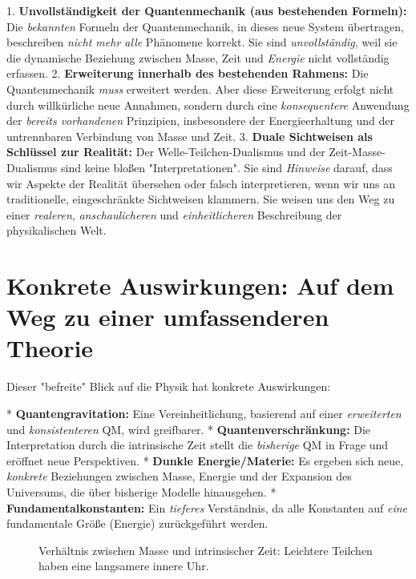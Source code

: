\documentclass[a4paper,12pt]{article}
\begin{document}
	1.  \textbf{Unvollständigkeit der Quantenmechanik (aus bestehenden Formeln):} Die \emph{bekannten} Formeln der Quantenmechanik, in dieses neue System übertragen, beschreiben \emph{nicht mehr alle} Phänomene korrekt. Sie sind \emph{unvollständig}, weil sie die dynamische Beziehung zwischen Masse, Zeit und \emph{Energie} nicht vollständig erfassen.
	2.  \textbf{Erweiterung innerhalb des bestehenden Rahmens:} Die Quantenmechanik \emph{muss} erweitert werden. Aber diese Erweiterung erfolgt nicht durch willkürliche neue Annahmen, sondern durch eine \emph{konsequentere} Anwendung der \emph{bereits vorhandenen} Prinzipien, insbesondere der Energieerhaltung und der untrennbaren Verbindung von Masse und Zeit.
	3.  \textbf{Duale Sichtweisen als Schlüssel zur Realität:} Der Welle-Teilchen-Dualismus und der Zeit-Masse-Dualismus sind keine bloßen "Interpretationen". Sie sind \emph{Hinweise} darauf, dass wir Aspekte der Realität übersehen oder falsch interpretieren, wenn wir uns an traditionelle, eingeschränkte Sichtweisen klammern. Sie weisen uns den Weg zu einer \emph{realeren}, \emph{anschaulicheren} und \emph{einheitlicheren} Beschreibung der physikalischen Welt.
	
	\section{Konkrete Auswirkungen: Auf dem Weg zu einer umfassenderen Theorie}
	Dieser "befreite" Blick auf die Physik hat konkrete Auswirkungen:
	
	*   \textbf{Quantengravitation:} Eine Vereinheitlichung, basierend auf einer \emph{erweiterten} und \emph{konsistenteren} QM, wird greifbarer.
	*   \textbf{Quantenverschränkung:} Die Interpretation durch die intrinsische Zeit stellt die \emph{bisherige} QM in Frage und eröffnet neue Perspektiven.
	*   \textbf{Dunkle Energie/Materie:} Es ergeben sich neue, \emph{konkrete} Beziehungen zwischen Masse, Energie und der Expansion des Universums, die über bisherige Modelle hinausgehen.
	*   \textbf{Fundamentalkonstanten:} Ein \emph{tieferes} Verständnis, da alle Konstanten auf \emph{eine} fundamentale Größe (Energie) zurückgeführt werden.
	
	\begin{figure}[h]
		\centering
		\caption{Verhältnis zwischen Masse und intrinsischer Zeit: Leichtere Teilchen haben eine langsamere innere Uhr.}
	\end{figure}
	
\end{document}
